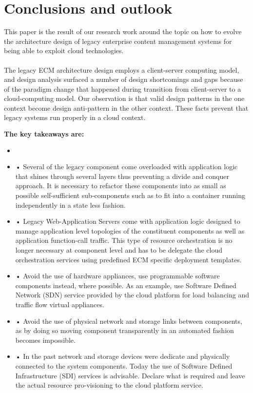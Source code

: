 \documentclass[EPiC]{easychair} %
\begin{document}

\section{Conclusions and outlook}
\label{conclusions}

This paper is the result of our research work around the topic on how to evolve the architecture design of legacy enterprise content management systems for being able to exploit cloud technologies. 

\paragraph{} The legacy ECM architecture design employs a client-server computing model, and design analysis surfaced a number of design shortcomings and gaps because of the paradigm change that happened during transition from client-server to a cloud-computing model. Our observation is that valid design patterns in the one context become design anti-pattern in the other context. These facts prevent that legacy systems run properly in a cloud context. 

\textbf{The key takeaways are:}

\begin{itemize}
    \item 
    \item •	Several of the legacy component come overloaded with application logic that shines through several layers thus preventing a divide and conquer approach. It is necessary to refactor these components into as small as possible self-sufficient sub-components such as to fit into a container running independently in a state less fashion. 
    \item •	Legacy Web-Application Servers come with application logic designed to manage application level topologies of the constituent components as well as application function-call traffic. This type of resource orchestration is no longer necessary at component level and has to be delegate the cloud orchestration services using predefined ECM specific deployment templates. 
    \item •	Avoid the use of hardware appliances, use programmable software components instead, where possible. As an example, use Software Defined Network (SDN) service provided by the cloud platform for load balancing and traffic flow virtual appliances.
    \item •	Avoid the use of physical network and storage links between components, as by doing so moving component transparently in an automated fashion becomes impossible.
    \item •	In the past network and storage devices were dedicate and physically connected to the system components. Today the use of Software Defined Infrastructure (SDI) services is advisable. Declare what is required and leave the actual resource pro-visioning to the cloud platform service.   
\end{itemize}
\end{document}
